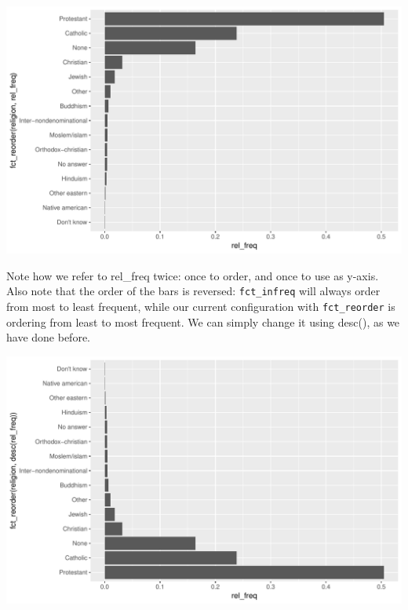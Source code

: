 \documentclass[]{tufte-book}
\newenvironment{Shaded}{}{}
\newcommand{\KeywordTok}[1]{\textcolor[rgb]{0.00,0.44,0.13}{\textbf{#1}}}
\newcommand{\DataTypeTok}[1]{\textcolor[rgb]{0.56,0.13,0.00}{#1}}
\newcommand{\StringTok}[1]{\textcolor[rgb]{0.25,0.44,0.63}{#1}}
\newcommand{\OperatorTok}[1]{\textcolor[rgb]{0.40,0.40,0.40}{#1}}
\newcommand{\NormalTok}[1]{#1}
\begin{document}
\includegraphics{cleaning_tutorial_files/figure-latex/unnamed-chunk-85-1}

Note how we refer to rel\_freq twice: once to order, and once to use as
y-axis. Also note that the order of the bars is reversed:
\texttt{fct\_infreq} will always order from most to least frequent,
while our current configuration with \texttt{fct\_reorder} is ordering
from least to most frequent. We can simply change it using desc(), as we
have done before.

\begin{Shaded}
\end{Shaded}

\includegraphics{cleaning_tutorial_files/figure-latex/unnamed-chunk-86-1}
\end{document}
